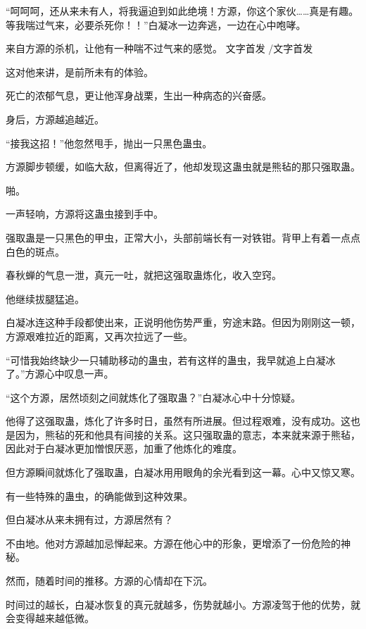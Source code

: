 
\begin{this_body}

“呵呵呵，还从来未有人，将我逼迫到如此绝境！方源，你这个家伙……真是有趣。等我喘过气来，必要杀死你！！”白凝冰一边奔逃，一边在心中咆哮。

来自方源的杀机，让他有一种喘不过气来的感觉。 文字首发 /文字首发

这对他来讲，是前所未有的体验。

死亡的浓郁气息，更让他浑身战栗，生出一种病态的兴奋感。

身后，方源越追越近。

“接我这招！”他忽然甩手，抛出一只黑色蛊虫。

方源脚步顿缓，如临大敌，但离得近了，他却发现这蛊虫就是熊毡的那只强取蛊。

啪。

一声轻响，方源将这蛊虫接到手中。

强取蛊是一只黑色的甲虫，正常大小，头部前端长有一对铁钳。背甲上有着一点点白色的斑点。

春秋蝉的气息一泄，真元一吐，就把这强取蛊炼化，收入空窍。

他继续拔腿猛追。

白凝冰连这种手段都使出来，正说明他伤势严重，穷途末路。但因为刚刚这一顿，方源艰难拉近的距离，又再次拉远了一些。

“可惜我始终缺少一只辅助移动的蛊虫，若有这样的蛊虫，我早就追上白凝冰了。”方源心中叹息一声。

“这个方源，居然顷刻之间就炼化了强取蛊？”白凝冰心中十分惊疑。

他得了这强取蛊，炼化了许多时日，虽然有所进展。但过程艰难，没有成功。这也是因为，熊毡的死和他具有间接的关系。这只强取蛊的意志，本来就来源于熊毡，因此对于白凝冰更加憎恨厌恶，加重了他炼化的难度。

但方源瞬间就炼化了强取蛊，白凝冰用用眼角的余光看到这一幕。心中又惊又寒。

有一些特殊的蛊虫，的确能做到这种效果。

但白凝冰从来未拥有过，方源居然有？

不由地。他对方源越加忌惮起来。方源在他心中的形象，更增添了一份危险的神秘。

然而，随着时间的推移。方源的心情却在下沉。

时间过的越长，白凝冰恢复的真元就越多，伤势就越小。方源凌驾于他的优势，就会变得越来越低微。


\end{this_body}
